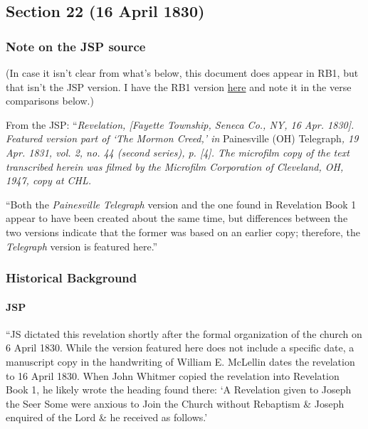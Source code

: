 \subsection{Section 22 (16 April 1830)}
	\label{DC22}
	
	\subsubsection{Note on the JSP source}
	
		(In case it isn't clear from what's below, this document does appear in RB1, but that isn't the JSP version. I have the RB1 version \hyperref[EXSS-DC22-RB1]{here} and note it in the verse comparisons below.)
		
		From the JSP: ``\textit{Revelation, [Fayette Township, Seneca Co., NY, 16 Apr. 1830]. Featured version part of `The Mormon Creed,' in} Painesville (OH) Telegraph\textit{, 19 Apr. 1831, vol. 2, no. 44 (second series), p. [4]. The microfilm copy of the text transcribed herein was filmed by the Microfilm Corporation of Cleveland, OH, 1947, copy at CHL.}
		
		``Both the \textit{Painesville Telegraph} version and the one found in Revelation Book 1 appear to have been created about the same time, but differences between the two versions indicate that the former was based on an earlier copy; therefore, the \textit{Telegraph} version is featured here.''
	
	\subsubsection{Historical Background}
		\label{DC22-HB}
		
		\paragraph{JSP}
		
			``JS dictated this revelation shortly after the formal organization of the church on 6 April 1830. While the version featured here does not include a specific date, a manuscript copy in the handwriting of William E. McLellin dates the revelation to 16 April 1830. When John Whitmer copied the revelation into Revelation Book 1, he likely wrote the heading found there: `A Revelation given to Joseph the Seer Some were anxious to Join the Church without Rebaptism \& Joseph enquired of the Lord \& he received as follows.'
			
